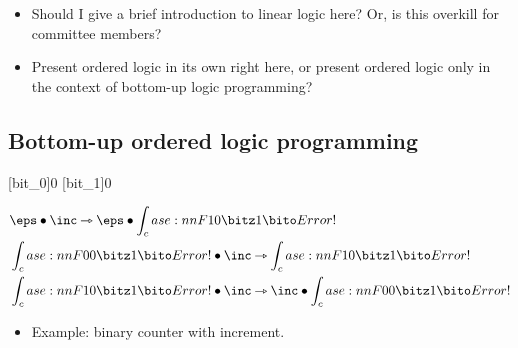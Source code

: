 \begin{itemize}
\item Should I give a brief introduction to linear logic here?  Or, is this overkill for committee members?
\item Present ordered logic in its own right here, or present ordered logic only in the context of bottom-up logic programming?
\end{itemize}

\subsection{Bottom-up ordered logic programming}\label{sec:ordered-lp}

\NewPredicate{\bitz}[bit_0]{0}
\NewPredicate{\bito}[bit_1]{0}
\ExplSyntaxOn
{}
\ExplSyntaxOff
{}

\begin{align*}
  &\eps \fuse \inc \lrimp \eps \fuse \bit{1} \\
  &\bit{0} \fuse \inc \lrimp \bit{1} \\
  &\bit{1} \fuse \inc \lrimp \inc \fuse \bit{0}
\end{align*}

\begin{itemize}
\item Example: binary counter with increment.
\end{itemize}


